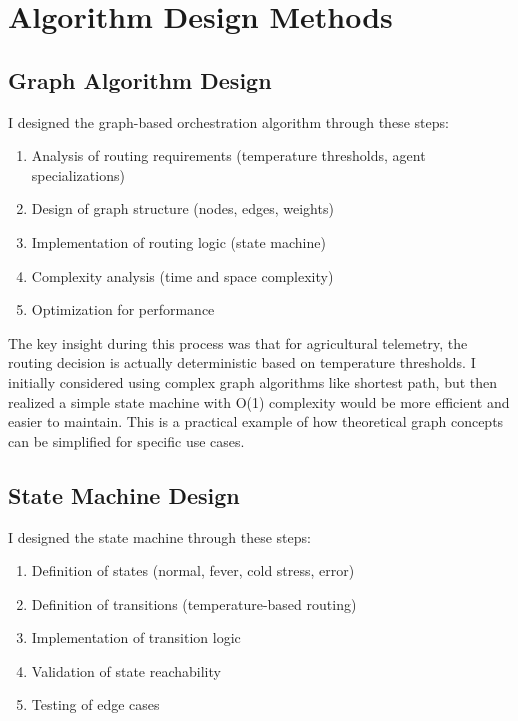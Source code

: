 \section{Algorithm Design Methods}

\subsection{Graph Algorithm Design}

I designed the graph-based orchestration algorithm through these steps:

\begin{enumerate}
    \item Analysis of routing requirements (temperature thresholds, agent specializations)
    \item Design of graph structure (nodes, edges, weights)
    \item Implementation of routing logic (state machine)
    \item Complexity analysis (time and space complexity)
    \item Optimization for performance
\end{enumerate}

The key insight during this process was that for agricultural telemetry, the routing decision is actually deterministic based on temperature thresholds. I initially considered using complex graph algorithms like shortest path, but then realized a simple state machine with O(1) complexity would be more efficient and easier to maintain. This is a practical example of how theoretical graph concepts can be simplified for specific use cases.

\subsection{State Machine Design}

I designed the state machine through these steps:

\begin{enumerate}
    \item Definition of states (normal, fever, cold stress, error)
    \item Definition of transitions (temperature-based routing)
    \item Implementation of transition logic
    \item Validation of state reachability
    \item Testing of edge cases
\end{enumerate}

